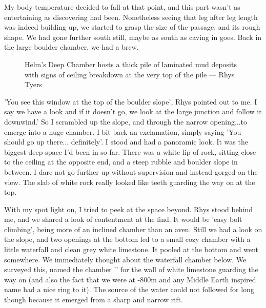 My body temperature decided to fall at that point, and this part wasn't as entertaining as discovering had been. Nonetheless seeing that leg after leg length was indeed building up, we started to grasp the size of the passage, and its rough shape. We had gone further south still, maybe as south as caving in  goes. Back in the large boulder chamber, we had a brew.

\begin{figure}[t!]
\checkoddpage \ifoddpage \forcerectofloat \else \forceversofloat \fi
\centering
{}
\caption{Helm's Deep Chamber hosts a thick pile of laminated mud deposits with signs of ceiling breakdown at the very top of the pile --- Rhys Tyers}
\label{helmsdeeo}
\end{figure}

'You see this window at the top of the boulder slope', Rhys pointed out to me. I say we have a look and if it doesn't go, we look at the large junction and follow it downwind.' So I scrambled up the slope, and through the narrow opening...to emerge into a huge chamber. I bit back an exclamation, simply saying 'You should go up there... definitely'. I stood and had a panoramic look. It was the biggest deep space I'd been in so far. There was a white lip of rock, sitting close to the ceiling at the opposite end, and a steep rubble and boulder slope in between. I dare not go further up without supervision and instead gorged on the view. The slab of white rock really looked like teeth guarding the way on at the top. 

With my spot light on, I tried to peek at the space beyond. Rhys stood behind me, and we shared a look of contentment at the find. It would be 'easy bolt climbing', being more of an inclined chamber than an aven. Still we had a look on the slope, and two openings at the bottom led to a small cozy chamber with a little waterfall and clean grey white limestone. It pooled at the bottom and went somewhere. We immediately thought about the waterfall chamber below. We surveyed this, named the chamber '' for the wall of white limestone guarding the way on (and also the fact that we were at -800m and any Middle Earth inspired name had a nice ring to it). The source of the water could not followed for long though because it emerged from a sharp and narrow rift. 

